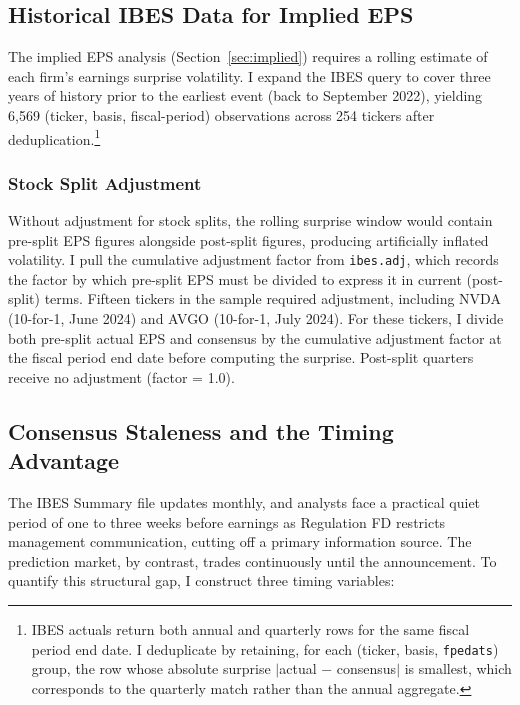 \documentclass[11pt]{article}
\begin{document}
\subsection{Historical IBES Data for Implied EPS} \label{sec:ibes_history}

The implied EPS analysis (Section~\ref{sec:implied}) requires a rolling estimate of each firm's earnings surprise volatility. I expand the IBES query to cover three years of history prior to the earliest event (back to September 2022), yielding 6,569 (ticker, basis, fiscal-period) observations across 254 tickers after deduplication.\footnote{IBES actuals return both annual and quarterly rows for the same fiscal period end date. I deduplicate by retaining, for each (ticker, basis, \texttt{fpedats}) group, the row whose absolute surprise $|$actual $-$ consensus$|$ is smallest, which corresponds to the quarterly match rather than the annual aggregate.}

\subsubsection{Stock Split Adjustment}

Without adjustment for stock splits, the rolling surprise window would contain pre-split EPS figures alongside post-split figures, producing artificially inflated volatility. I pull the cumulative adjustment factor from \texttt{ibes.adj}, which records the factor by which pre-split EPS must be divided to express it in current (post-split) terms. Fifteen tickers in the sample required adjustment, including NVDA (10-for-1, June 2024) and AVGO (10-for-1, July 2024). For these tickers, I divide both pre-split actual EPS and consensus by the cumulative adjustment factor at the fiscal period end date before computing the surprise. Post-split quarters receive no adjustment (factor = 1.0).

\subsection{Consensus Staleness and the Timing Advantage}

The IBES Summary file updates monthly, and analysts face a practical quiet period of one to three weeks before earnings as Regulation FD \citep{heflin2003regulation} restricts management communication, cutting off a primary information source. The prediction market, by contrast, trades continuously until the announcement. To quantify this structural gap, I construct three timing variables:
\end{document}
